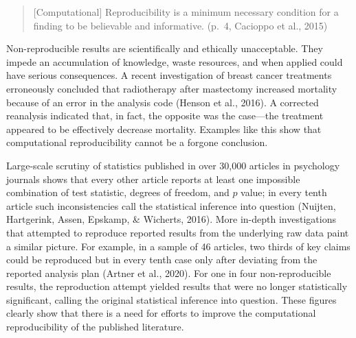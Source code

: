 \documentclass[
  ,man,floatsintext]{apa6}
\begin{document}
\begin{quote}
{[}Computational{]} Reproducibility is a minimum necessary condition for a finding to be believable and informative.
(p.~4, Cacioppo et al., 2015)
\end{quote}

Non-reproducible results are scientifically and ethically unacceptable.
They impede an accumulation of knowledge, waste resources, and when applied could have serious consequences.
A recent investigation of breast cancer treatments erroneously concluded that radiotherapy after mastectomy increased mortality because of an error in the analysis code (Henson et al., 2016).
A corrected reanalysis indicated that, in fact, the opposite was the case---the treatment appeared to be effectively decrease mortality.
Examples like this show that computational reproducibility cannot be a forgone conclusion.

Large-scale scrutiny of statistics published in over 30,000 articles in psychology journals shows that every other article reports at least one impossible combination of test statistic, degrees of freedom, and \(p\) value; in every tenth article such inconsistencies call the statistical inference into question (Nuijten, Hartgerink, Assen, Epskamp, \& Wicherts, 2016).
More in-depth investigations that attempted to reproduce reported results from the underlying raw data paint a similar picture.
For example, in a sample of 46 articles, two thirds of key claims could be reproduced but in every tenth case only after deviating from the reported analysis plan (Artner et al., 2020).
For one in four non-reproducible results, the reproduction attempt yielded results that were no longer statistically significant, calling the original statistical inference into question.
These figures clearly show that there is a need for efforts to improve the computational reproducibility of the published literature.
\end{document}
